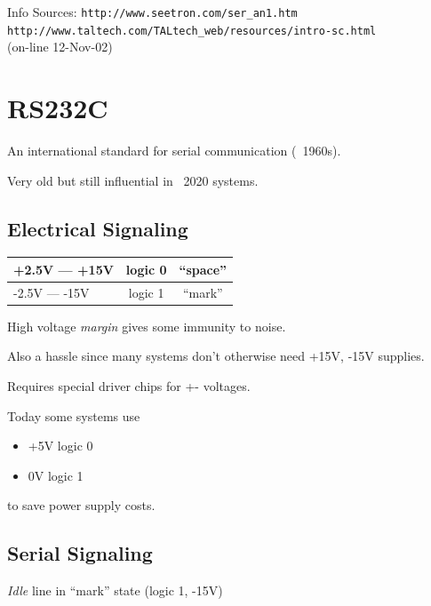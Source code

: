 Info Sources:
{\tt http://www.seetron.com/ser\_an1.htm} \\
{\tt http://www.taltech.com/TALtech\_web/resources/intro-sc.html }\\
(on-line 12-Nov-02)

\section*{RS232C}

An international standard for serial communication (~1960s).

Very old but still influential in ~2020 systems.

\subsection{Electrical Signaling}

\begin{tabular}{|l|c|c|}\hline
+2.5V --- +15V  &  logic 0 &  ``space'' \\ \hline
-2.5V --- -15V  &  logic 1 &  ``mark''  \\ \hline
\end{tabular}

High voltage {\it margin} gives some immunity to noise.

Also a hassle since many systems don't otherwise
need +15V, -15V supplies.

Requires special driver chips for +- voltages.

Today some systems use

\begin{itemize}
        \item +5V logic 0
        \item  0V logic 1
\end{itemize}

to save power supply costs.


\subsection{Serial Signaling}

{\it Idle} line in ``mark'' state (logic 1, -15V)

